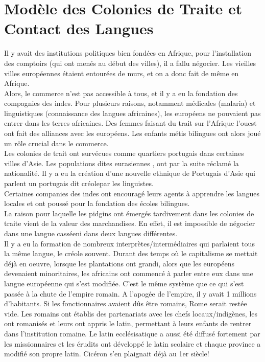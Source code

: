 \documentclass{cours}
\begin{document}
\section{Modèle des Colonies de Traite et Contact des Langues}
Il y avait des institutions politiques bien fondées en Afrique, pour l'installation des comptoirs (qui ont menés au début des villes), il a fallu négocier. 
Les vieilles villes européennes étaient entourées de murs, et on a donc fait de même en Afrique. \\
Alors, le commerce n'est pas accessible à tous, et il y a eu la fondation des compagnies des indes. 
Pour plusieurs raisons, notamment médicales (malaria) et linguistiques (connaissance des langues africaines), les européens ne pouvaient pas entrer dans les terres africaines.
Des femmes faisant du trait sur l'Afrique l'ouest ont fait des alliances avec les européens. Les enfants métis bilingues ont alors joué un rôle crucial dans le commerce.\\
Les colonies de trait ont survécues comme quartiers portugais dans certaines villes d'Asie. Les populations dites \og eurasiennes \fg, ont par la suite réclamé la nationalité.
Il y a eu la création d'une nouvelle ethnique de Portugais d'Asie qui parlent un portugais dit \og créole\fg par les linguistes.\\
Certaines companies des indes ont encouragé leurs agents à apprendre les langues locales et ont poussé pour la fondation des écoles bilingues.\\
La raison pour laquelle les pidgins ont émergés tardivement dans les colonies de traite vient de la valeur des marchandises. En effet, il est impossible de négocier dans une langue \og cassée\fg ni dans deux langues différentes.\\
Il y a eu la formation de nombreux interprètes/intermédiaires qui parlaient tous la même langue, le créole souvent. Durant des temps où le capitalisme se mettait déjà en oeuvre, lorsque les plantations ont grandi, alors que les européens devenaient minoritaires, les africains ont commencé à parler entre eux dans une langue européenne qui s'est modifiée.
C'est le même système que ce qui s'est passée à la chute de l'empire romain. A l'apogée de l'empire, il y avait 1 millions d'habitants. Si les fonctionnaires avaient dûs être romains, Rome serait restée vide. 
Les romains ont établis des partenariats avec les chefs locaux/indigènes, les ont romanisés et leurs ont appris le latin, permettant à leurs enfants de rentrer dans l'institution romaine. 
Le latin ecclésisatique a aussi été diffusé fortement par les missionnaires et les érudits ont développé le latin scolaire et chaque province a modifié son propre latin. Cicéron s'en plaignait déjà au 1er siècle!\\
\end{document}
